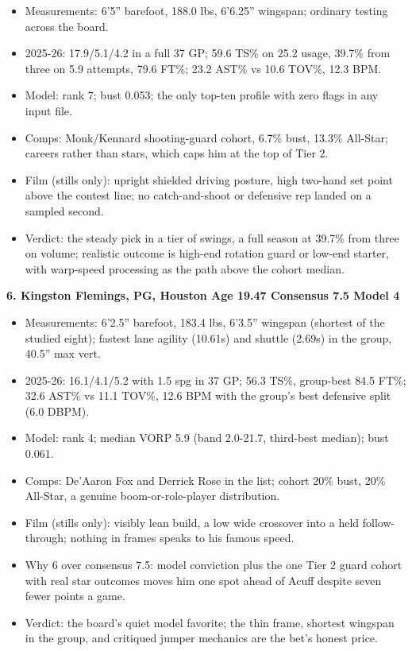 \documentclass[
  10pt,
]{article}
\providecommand{\tightlist}{%
  \setlength{\itemsep}{0pt}\setlength{\parskip}{0pt}}
\begin{document}
\begin{itemize}
\tightlist
\item
  Measurements: 6'5'' barefoot, 188.0 lbs, 6'6.25'' wingspan; ordinary testing
  across the board.
\item
  2025-26: 17.9/5.1/4.2 in a full 37 GP; 59.6 TS\% on 25.2 usage, 39.7\% from
  three on 5.9 attempts, 79.6 FT\%; 23.2 AST\% vs 10.6 TOV\%, 12.3 BPM.
\item
  Model: rank 7; bust 0.053; the only top-ten profile with zero flags in any
  input file.
\item
  Comps: Monk/Kennard shooting-guard cohort, 6.7\% bust, 13.3\% All-Star;
  careers rather than stars, which caps him at the top of Tier 2.
\item
  Film (stills only): upright shielded driving posture, high two-hand set point
  above the contest line; no catch-and-shoot or defensive rep landed on a
  sampled second.
\item
  Verdict: the steady pick in a tier of swings, a full season at 39.7\% from
  three on volume; realistic outcome is high-end rotation guard or low-end
  starter, with warp-speed processing as the path above the cohort median.
\end{itemize}

\textbf{6. Kingston Flemings, PG, Houston \textbar{} Age 19.47 \textbar{}
Consensus 7.5 \textbar{} Model 4}

\begin{itemize}
\tightlist
\item
  Measurements: 6'2.5'' barefoot, 183.4 lbs, 6'3.5'' wingspan (shortest of the
  studied eight); fastest lane agility (10.61s) and shuttle (2.69s) in the
  group, 40.5'' max vert.
\item
  2025-26: 16.1/4.1/5.2 with 1.5 spg in 37 GP; 56.3 TS\%, group-best 84.5 FT\%;
  32.6 AST\% vs 11.1 TOV\%, 12.6 BPM with the group's best defensive split (6.0
  DBPM).
\item
  Model: rank 4; median VORP 5.9 (band 2.0-21.7, third-best median); bust 0.061.
\item
  Comps: De'Aaron Fox and Derrick Rose in the list; cohort 20\% bust, 20\%
  All-Star, a genuine boom-or-role-player distribution.
\item
  Film (stills only): visibly lean build, a low wide crossover into a held
  follow-through; nothing in frames speaks to his famous speed.
\item
  Why 6 over consensus 7.5: model conviction plus the one Tier 2 guard cohort
  with real star outcomes moves him one spot ahead of Acuff despite seven fewer
  points a game.
\item
  Verdict: the board's quiet model favorite; the thin frame, shortest wingspan
  in the group, and critiqued jumper mechanics are the bet's honest price.
\end{itemize}
\end{document}
